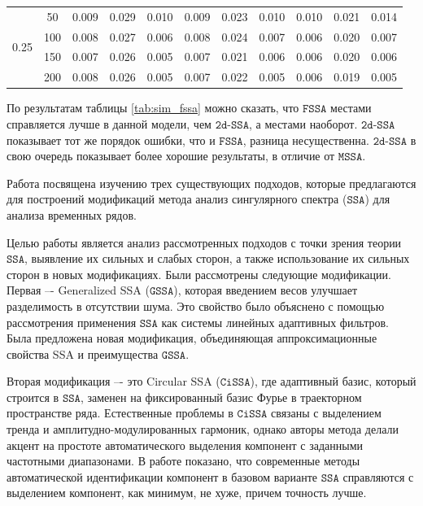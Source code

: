 \documentclass[12pt, specialist, subf
]{disser}
\theoremstyle{definition}
\newcommand{\SSA}{\texttt{SSA}}
\newcommand{\GSSA}{\texttt{GSSA}}
\newcommand{\CISSA}{\texttt{CiSSA}}
\newcommand{\MSSA}{\texttt{MSSA}}
\newcommand{\FSSA}{\texttt{FSSA}}
\newcommand{\DSSA}{\texttt{2d-SSA}}
\begin{document}
\begin{table}[H]
\begin{tabular}{c|c|ccc|ccc|ccc}
		\midrule
		\multirow{4}{*}{0.25}         & 50                       & 0.009                       & 0.029                       & 0.010                      & 0.009  & 0.023 & 0.010 & 0.010  & 0.021 & 0.014 \\
		                              & 100                      & 0.008                       & 0.027                       & 0.006                      & 0.008  & 0.024 & 0.007 & 0.006  & 0.020 & 0.007 \\
		                              & 150                      & 0.007                       & 0.026                       & 0.005                      & 0.007  & 0.021 & 0.006 & 0.006  & 0.020 & 0.006 \\
		                              & 200                      & 0.008                       & 0.026                       & 0.005                      & 0.007  & 0.022 & 0.005 & 0.006  & 0.019 & 0.005 \\
		\bottomrule
	\end{tabular}
\end{table}


По результатам таблицы \ref{tab:sim_fssa} можно сказать, что $\FSSA$ местами справляется лучше в данной модели, чем $\DSSA$, а местами наоборот. $\DSSA$ показывает тот же порядок ошибки, что и $\FSSA$, разница несущественна. $\DSSA$ в свою очередь показывает более хорошие результаты, в отличие от $\MSSA$.


\newpage



\conclusion
\label{sec:concl}


Работа посвящена изучению трех существующих подходов, которые предлагаются для построений модификаций метода анализ сингулярного спектра ($\SSA$) для анализа временных рядов. 

Целью работы является анализ рассмотренных подходов с точки зрения теории $\SSA$, выявление их сильных и слабых сторон, а также использование их сильных сторон в новых модификациях. Были рассмотрены следующие модификации. Первая –- Generalized SSA ($\GSSA$), которая введением весов улучшает разделимость в отсутствии шума. Это свойство было объяснено с помощью рассмотрения применения $\SSA$ как системы линейных адаптивных фильтров. Была предложена новая модификация, объединяющая аппроксимационные свойства SSA и преимущества $\GSSA$. 

Вторая модификация –- это Circular SSA ($\CISSA$), где адаптивный базис, который строится в $\SSA$, заменен на фиксированный базис Фурье в траекторном пространстве ряда. Естественные проблемы в $\CISSA$ связаны с выделением тренда и амплитудно-модулированных гармоник, однако авторы метода делали акцент на простоте автоматического выделения компонент с заданными частотными диапазонами. В работе показано, что современные методы автоматической идентификации компонент в базовом варианте $\SSA$ справляются с выделением компонент, как минимум, не хуже, причем точность лучше. 
\end{document}
